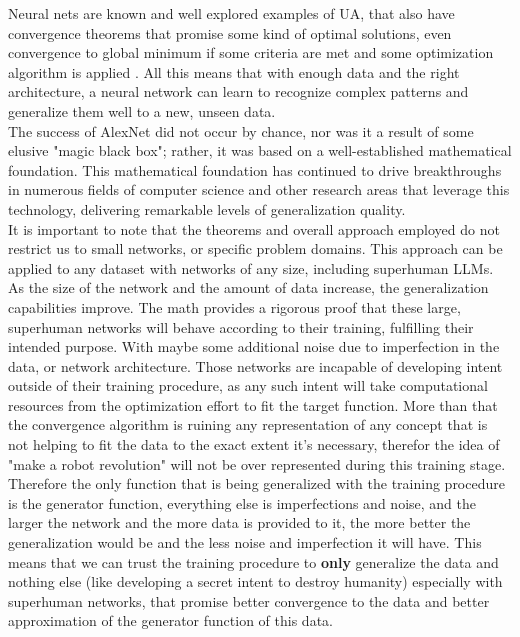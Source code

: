 \documentclass{article}
\begin{document}
Neural nets are known and well explored examples of UA\cite{hornik1989multilayer}, that also have convergence theorems that promise some kind of optimal solutions, even convergence to global minimum if some criteria are met and some optimization algorithm is applied \cite{behera2006adaptive, kawaguchi2021recipe, zhiteckii2012convergence}. All this means that with enough data and the right architecture, a neural network can learn to recognize complex patterns and generalize them well to a new, unseen data\cite{sejnowski2020unreasonable}.\\

The success of AlexNet did not occur by chance, nor was it a result of some elusive "magic black box"; rather, it was based on a well-established mathematical foundation. This mathematical foundation has continued to drive breakthroughs in numerous fields of computer science and other research areas that leverage this technology, delivering remarkable levels of generalization quality.\\

It is important to note that the theorems and overall approach employed do not restrict us to small networks, or specific problem domains. This approach can be applied to any dataset with networks of any size, including superhuman LLMs. As the size of the network and the amount of data increase, the generalization capabilities improve. The math provides a rigorous proof that these large, superhuman networks will behave according to their training, fulfilling their intended purpose. With maybe some additional noise due to imperfection in the data, or network architecture. Those networks are incapable of developing intent outside of their training procedure, as any such intent will take computational resources from the optimization effort to fit the target function. More than that the convergence algorithm is ruining any representation of any concept that is not helping to fit the data to the exact extent it's necessary, therefor the idea of "make a robot revolution" will not be over represented during this training stage. Therefore the only function that is being generalized with the training procedure is the generator function, everything else is imperfections and noise, and the larger the network and the more data is provided to it, the more better the generalization would be and the less noise and imperfection it will have. This means that we can trust the training procedure to \textbf{only} generalize the data and nothing else (like developing a secret intent to destroy humanity) especially with superhuman networks, that promise better convergence to the data and better approximation of the generator function of this data.\\
\end{document}
